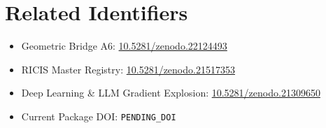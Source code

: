 \documentclass[11pt,a4paper]{article}
\begin{document}
\section{Related Identifiers}
\begin{itemize}
    \item Geometric Bridge A6: \href{https://doi.org/10.5281/zenodo.22124493}{10.5281/zenodo.22124493}
    \item RICIS Master Registry: \href{https://doi.org/10.5281/zenodo.21517353}{10.5281/zenodo.21517353}
    \item Deep Learning \& LLM Gradient Explosion: \href{https://doi.org/10.5281/zenodo.21309650}{10.5281/zenodo.21309650}
    \item Current Package DOI: \texttt{PENDING\_DOI}
\end{itemize}
\end{document}
